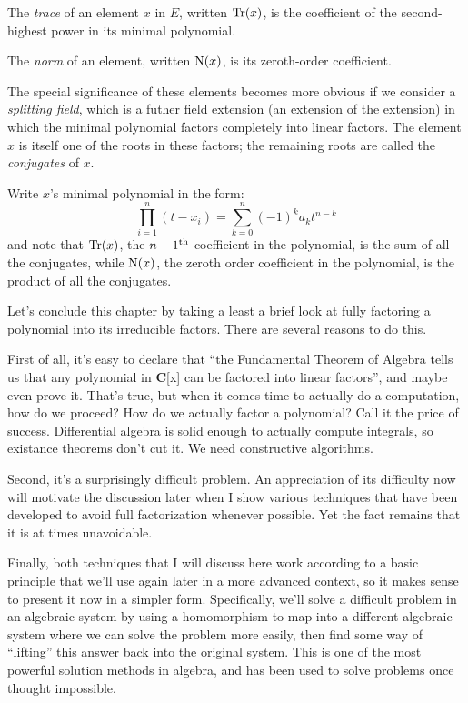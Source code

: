 The {\it trace} of an
element $x$ in $E$, written ${\rm Tr}(x)$, is the coefficient
of the second-highest power in its minimal polynomial.
\enddefinition

The {\it norm} of an element, written ${\rm N}(x)$, is its zeroth-order coefficient.
\enddefinition

The special significance of these elements becomes more obvious if we
consider a {\it splitting field}, which is a futher field extension
(an extension of the extension) in which the minimal polynomial
factors completely into linear factors.  The element $x$ is
itself one of the roots in these factors; the remaining
roots are called the {\it conjugates} of $x$.

Write $x$'s minimal polynomial in the form:
$$\prod_{i=1}^n \left( t - x_i \right) = \sum_{k=0}^n (-1)^{k} a_k t^{n-k}$$
and note that ${\rm Tr}(x)$, the $n-1^{\rm th}$ coefficient in the polynomial,
is the sum of all the conjugates, while ${\rm N}(x)$, the zeroth order
coefficient in the polynomial, is the product of all the conjugates.

\vfill\eject


Let's conclude this chapter by taking a least a brief look at fully
factoring a polynomial into its irreducible factors.  There are
several reasons to do this.

First of all, it's easy to declare that ``the Fundamental Theorem of
Algebra tells us that any polynomial in {\bf C}[x] can be factored
into linear factors'', and maybe even prove it.  That's true, but when it comes
time to actually do a computation, how do we proceed?  How do we
actually factor a polynomial?  Call it the price of success.
Differential algebra is solid enough to actually compute integrals, so
existance theorems don't cut it.  We need constructive algorithms.

Second, it's a surprisingly difficult problem.  An appreciation of its
difficulty now will motivate the discussion later when I show various
techniques that have been developed to avoid full factorization
whenever possible.  Yet the fact remains that it is at times
unavoidable.

Finally, both techniques that I will discuss here work according to a
basic principle that we'll use again later in a more advanced context,
so it makes sense to present it now in a simpler form.  Specifically,
we'll solve a difficult problem in an algebraic system by using a
homomorphism to map into a different algebraic system where we can
solve the problem more easily, then find some way of ``lifting'' this
answer back into the original system.  This is one of the most
powerful solution methods in algebra, and has been used to solve
problems once thought impossible.

